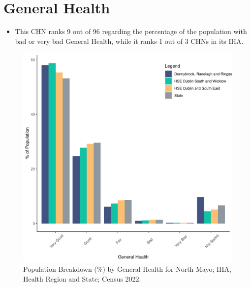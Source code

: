 \documentclass{article}
\begin{document}
\pagebreak

\section{General Health}\label{sect:GenHealth}
\begin{itemize}
\item  This CHN ranks  9 out of 96 regarding the percentage of the population with bad or very bad General Health, while it ranks   1 out of 3 CHNs in its IHA.
\end{itemize}
\begin{figure}[h]
	\centering
	\includegraphics[width = 150mm]{../figures/GenED.pdf}
	\caption{Population Breakdown (\%) by General Health for North Mayo; IHA, Health Region and State;  Census 2022.}
	\label{fig:2ae19629-1a6a-13a3-e055-000000000001}
	\end{figure}
\end{document}
